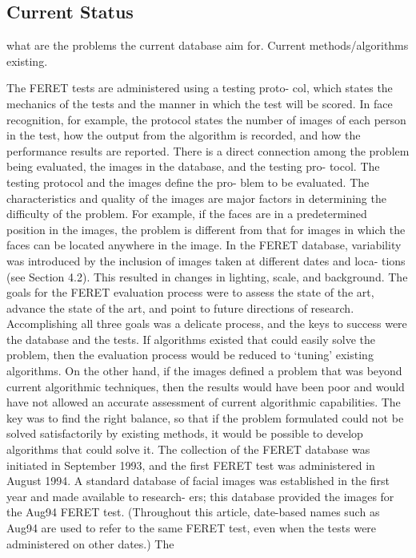 \subsection{Current Status}
what are the problems the current database aim for.
Current methods/algorithms existing.


The FERET tests are administered using a testing proto-
col, which states the mechanics of the tests and the manner
in which the test will be scored. In face recognition, for
example, the protocol states the number of images of each
person in the test, how the output from the algorithm is
recorded, and how the performance results are reported.
There is a direct connection among the problem being
evaluated, the images in the database, and the testing pro-
tocol. The testing protocol and the images define the pro-
blem to be evaluated. The characteristics and quality of the
images are major factors in determining the difficulty of the
problem. For example, if the faces are in a predetermined
position in the images, the problem is different from that for
images in which the faces can be located anywhere in the
image. In the FERET database, variability was introduced
by the inclusion of images taken at different dates and loca-
tions (see Section 4.2). This resulted in changes in lighting,
scale, and background.
The goals for the FERET evaluation process were to assess
the state of the art, advance the state of the art, and point to
future directions of research. Accomplishing all three goals
was a delicate process, and the keys to success were the
database and the tests. If algorithms existed that could easily
solve the problem, then the evaluation process would be
reduced to ‘tuning’ existing algorithms. On the other hand,
if the images defined a problem that was beyond current
algorithmic techniques, then the results would have been
poor and would have not allowed an accurate assessment of
current algorithmic capabilities. The key was to find the right
balance, so that if the problem formulated could not be solved
satisfactorily by existing methods, it would be possible to
develop algorithms that could solve it.
The collection of the FERET database was initiated in
September 1993, and the first FERET test was administered
in August 1994. A standard database of facial images was
established in the first year and made available to research-
ers; this database provided the images for the Aug94
FERET test. (Throughout this article, date-based names
such as Aug94 are used to refer to the same FERET test,
even when the tests were administered on other dates.) The
